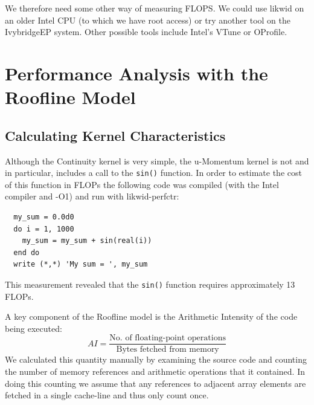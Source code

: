 \documentclass[12pt]{article}
\begin{document}
We therefore need some other way of measuring FLOPS. We could use
likwid on an older Intel CPU (to which we have root access) or try
another tool on the IvybridgeEP system. Other possible tools include
Intel's VTune or OProfile.

\section{Performance Analysis with the Roofline Model}

\subsection{Calculating Kernel Characteristics}

Although the Continuity kernel is very simple, the u-Momentum kernel
is not and in particular, includes a call to the {\tt sin()} function.
In order to estimate the cost of this function in FLOPs the following
code was compiled (with the Intel compiler and -O1) and run with
likwid-perfctr:
\begin{verbatim}
  my_sum = 0.0d0
  do i = 1, 1000
    my_sum = my_sum + sin(real(i))
  end do
  write (*,*) 'My sum = ', my_sum
\end{verbatim}
This measurement revealed that the {\tt sin()} function requires
approximately 13 FLOPs.

A key component of the Roofline model is the Arithmetic Intensity of
the code being executed:
\begin{equation}
AI = \frac{\textrm{No. of floating-point operations}}{\textrm{Bytes fetched from memory}}
\end{equation}
We calculated this quantity manually by examining the
source code and counting the number of memory references and
arithmetic operations that it contained. In doing this counting we
assume that any references to adjacent array elements are fetched in a
single cache-line and thus only count once.
\end{document}
